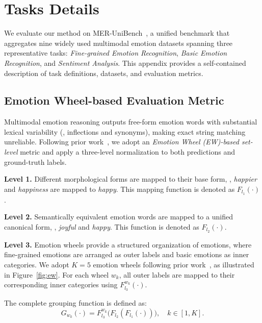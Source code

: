 \documentclass{article}
\theoremstyle{plain}
\theoremstyle{definition}
\theoremstyle{remark}
\begin{document}
\section{Tasks Details}
\label{appendix:tasks-and-datasets}

We evaluate our method on MER-UniBench~\cite{lian2025affectgpt}, a unified benchmark that aggregates nine widely used multimodal emotion datasets spanning three representative tasks:
\emph{Fine-grained Emotion Recognition}, \emph{Basic Emotion Recognition}, and \emph{Sentiment Analysis}.
This appendix provides a self-contained description of task definitions, datasets, and evaluation metrics.

\subsection{Emotion Wheel-based Evaluation Metric}
\label{appendix:ew-metric-full}

Multimodal emotion reasoning outputs free-form emotion words with substantial lexical variability (\eg, inflections and synonyms), making exact string matching unreliable. 
Following prior work~\cite{lian2025affectgpt, lian2025affectgptr1}, we adopt an \emph{Emotion Wheel (EW)-based set-level} metric and apply a three-level normalization to both predictions and ground-truth labels.


\textbf{Level 1.}
Different morphological forms are mapped to their base form, \eg, \emph{happier} and \emph{happiness} are mapped to \emph{happy}.
This mapping function is denoted as $F_{l_1}(\cdot)$.

\textbf{Level 2.}
Semantically equivalent emotion words are mapped to a unified canonical form, \eg, \emph{joyful} and \emph{happy}.
This function is denoted as $F_{l_2}(\cdot)$.

\textbf{Level 3.}
Emotion wheels provide a structured organization of emotions, where fine-grained emotions are arranged as outer labels and basic emotions as inner categories.
We adopt $K=5$ emotion wheels following prior work~\cite{lian2025affectgpt}, as illustrated in Figure~\ref{fig:ew}.
For each wheel $w_k$, all outer labels are mapped to their corresponding inner categories using $F_{l_3}^{w_k}(\cdot)$.


The complete grouping function is defined as:
\begin{equation}
G_{w_k}(\cdot) = F_{l_3}^{w_k}\bigl(F_{l_2}(F_{l_1}(\cdot))\bigr), \quad k \in [1, K].
\end{equation}
\end{document}
